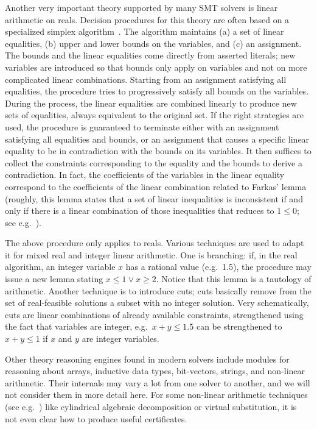 \documentclass{llncs}
\begin{document}
Another very important theory supported by many SMT solvers is linear
arithmetic on reals.  Decision procedures for this theory are often based on
a specialized simplex algorithm~\cite{Dutertre1,KBD13}.  The algorithm
maintains (a) a set of linear equalities, (b) upper and lower bounds on the
variables, and (c) an assignment.  The bounds and the linear equalities come
directly from asserted literals; new variables are introduced so that bounds
only apply on variables and not on more complicated linear combinations.
Starting from an assignment satisfying all equalities, the procedure tries to
progressively satisfy all bounds on the variables.  During the process, the
linear equalities are combined linearly to produce new sets of equalities,
always equivalent to the original set.  If the right strategies are used, the
procedure is guaranteed to terminate either with an assignment satisfying all
equalities and bounds, or an assignment that causes a specific linear equality
to be in contradiction with the bounds on its variables.  It then suffices to
collect the constraints corresponding to the equality and the bounds to derive
a contradiction. In fact, the coefficients of the
variables in the linear equality correspond to the coefficients of the linear
combination related to Farkas' lemma (roughly, this lemma states that a set of
linear inequalities is inconsistent if and only if there is a linear
combination of those inequalities that reduces to $1 \leq 0$;  see e.g.~\cite{Bockmayr1}).

The above procedure only applies to reals.  Various techniques are used to adapt
it for mixed real and integer linear arithmetic.  One is branching: if, in the
real algorithm, an integer variable $x$ has a rational value (e.g.\ 1.5), the
procedure may issue a new lemma stating $x\leq 1 \vee x \geq 2$.  Notice that
this lemma is a tautology of arithmetic.  Another technique is to introduce
cuts; cuts basically remove from the set of real-feasible solutions a subset
with no integer solution.  Very schematically, cuts are linear combinations of
already available constraints, strengthened using the fact that variables are
integer, e.g.\ $x+y \leq 1.5$ can be strengthened to $x + y \leq 1$ if $x$ and
$y$ are integer variables.

Other theory reasoning engines found in modern solvers include modules for
reasoning about arrays, inductive data types, bit-vectors, strings, and
non-linear arithmetic.
Their internals may vary a lot from one solver to another, and we will not
consider them in more detail here.  For some non-linear arithmetic techniques
(see e.g.~\cite{Bockmayr1}) like cylindrical algebraic decomposition or
virtual substitution, it is not even clear how to produce useful certificates.
\end{document}
